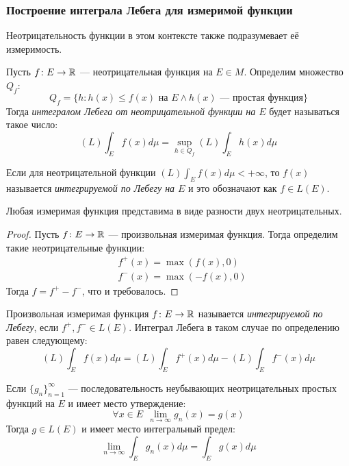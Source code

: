\subsubsection*{Построение интеграла Лебега для измеримой функции}

\begin{note}
	Неотрицательность функции в этом контексте также подразумевает её измеримость.
\end{note}

\begin{definition}
	Пусть $f \colon E \to \mathbb{R}$ --- неотрицательная функция на $E \in M$. Определим множество $Q_f$:
	\[
		Q_f = \{h \colon h(x) \le f(x) \text{ на } E \wedge h(x) \text{ --- простая функция}\}
	\]
	Тогда \textit{интегралом Лебега от неотрицательной функции на $E$} будет называться такое число:
	\[
		(L)\int_E f(x)d\mu = \sup_{h \in Q_f} (L)\int_E h(x)d\mu
	\]
\end{definition}

\begin{definition}
	Если для неотрицательной функции $(L)\int_E f(x)d\mu < +\infty$, то $f(x)$ называется \textit{интегрируемой по Лебегу на $E$} и это обозначают как $f \in L(E)$.
\end{definition}

\begin{proposition}
	Любая измеримая функция представима в виде разности двух неотрицательных.
\end{proposition}

\begin{proof}
	Пусть $f \colon E \to \mathbb{R}$ --- произвольная измеримая функция. Тогда определим такие неотрицательные функции:
	\begin{align*}
		&{f^+(x) = \max(f(x), 0)}
		\\
		&{f^-(x) = \max(-f(x), 0)}
	\end{align*}
	Тогда $f = f^+ - f^-$, что и требовалось.
\end{proof}

\begin{definition}
	Произвольная измеримая функция $f \colon E \to \mathbb{R}$ называется \textit{интегрируемой по Лебегу}, если $f^+, f^- \in L(E)$. Интеграл Лебега в таком случае по определению равен следующему:
	\[
		(L)\int_E f(x)d\mu = (L)\int_E f^+(x)d\mu - (L)\int_E f^-(x)d\mu
	\]
\end{definition}

\begin{proposition}
	Если $\{g_n\}_{n = 1}^\infty$ --- последовательность неубывающих неотрицательных простых функций на $E$ и имеет место утверждение:
	\[
		\forall x \in E\ \ \lim_{n \to \infty} g_n(x) = g(x)
	\]
	Тогда $g \in L(E)$ и имеет место интегральный предел:
	\[
		\lim_{n \to \infty} \int_E g_n(x)d\mu = \int_E g(x)d\mu
	\]
\end{proposition}

